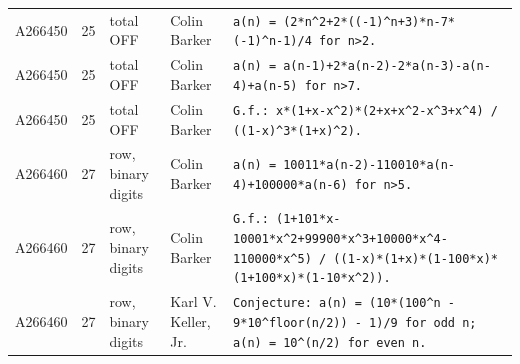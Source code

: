 \documentclass[11pt]{article}
\theoremstyle{definition}
\theoremstyle{remark}
\begin{document}
{\begin{longtable}{p{1.3cm}p{0.7cm}p{2.4cm}p{2.3cm}p{7.3cm}}
A266450 & 25 & total OFF & Colin Barker & \texttt{a(n)\allowbreak{} \allowbreak{}=\allowbreak{} \allowbreak{}(2*\allowbreak{}n\^{}2+\allowbreak{}2*\allowbreak{}((-\allowbreak{}1)\allowbreak{}\^{}n+\allowbreak{}3)\allowbreak{}*\allowbreak{}n-\allowbreak{}7*\allowbreak{}(-\allowbreak{}1)\allowbreak{}\^{}n-\allowbreak{}1)\allowbreak{}/\allowbreak{}4 \allowbreak{}for \allowbreak{}n>2.} \\
A266450 & 25 & total OFF & Colin Barker & \texttt{a(n)\allowbreak{} \allowbreak{}=\allowbreak{} \allowbreak{}a(n-\allowbreak{}1)\allowbreak{}+\allowbreak{}2*\allowbreak{}a(n-\allowbreak{}2)\allowbreak{}-\allowbreak{}2*\allowbreak{}a(n-\allowbreak{}3)\allowbreak{}-\allowbreak{}a(n-\allowbreak{}4)\allowbreak{}+\allowbreak{}a(n-\allowbreak{}5)\allowbreak{} \allowbreak{}for \allowbreak{}n>7.} \\
A266450 & 25 & total OFF & Colin Barker & \texttt{G.f.: \allowbreak{}x*\allowbreak{}(1+\allowbreak{}x-\allowbreak{}x\^{}2)\allowbreak{}*\allowbreak{}(2+\allowbreak{}x+\allowbreak{}x\^{}2-\allowbreak{}x\^{}3+\allowbreak{}x\^{}4)\allowbreak{} \allowbreak{}/\allowbreak{} \allowbreak{}((1-\allowbreak{}x)\allowbreak{}\^{}3*\allowbreak{}(1+\allowbreak{}x)\allowbreak{}\^{}2)\allowbreak{}.} \\
A266460 & 27 & row, binary digits & Colin Barker & \texttt{a(n)\allowbreak{} \allowbreak{}=\allowbreak{} \allowbreak{}10011*\allowbreak{}a(n-\allowbreak{}2)\allowbreak{}-\allowbreak{}110010*\allowbreak{}a(n-\allowbreak{}4)\allowbreak{}+\allowbreak{}100000*\allowbreak{}a(n-\allowbreak{}6)\allowbreak{} \allowbreak{}for \allowbreak{}n>5.} \\
A266460 & 27 & row, binary digits & Colin Barker & \texttt{G.f.: \allowbreak{}(1+\allowbreak{}101*\allowbreak{}x-\allowbreak{}10001*\allowbreak{}x\^{}2+\allowbreak{}99900*\allowbreak{}x\^{}3+\allowbreak{}10000*\allowbreak{}x\^{}4-\allowbreak{}110000*\allowbreak{}x\^{}5)\allowbreak{} \allowbreak{}/\allowbreak{} \allowbreak{}((1-\allowbreak{}x)\allowbreak{}*\allowbreak{}(1+\allowbreak{}x)\allowbreak{}*\allowbreak{}(1-\allowbreak{}100*\allowbreak{}x)\allowbreak{}*\allowbreak{}(1+\allowbreak{}100*\allowbreak{}x)\allowbreak{}*\allowbreak{}(1-\allowbreak{}10*\allowbreak{}x\^{}2)\allowbreak{})\allowbreak{}.} \\
A266460 & 27 & row, binary digits & Karl V. Keller, Jr. & \texttt{Conjecture: \allowbreak{}a(n)\allowbreak{} \allowbreak{}=\allowbreak{} \allowbreak{}(10*\allowbreak{}(100\^{}n \allowbreak{}-\allowbreak{} \allowbreak{}9*\allowbreak{}10\^{}floor(n/\allowbreak{}2)\allowbreak{})\allowbreak{} \allowbreak{}-\allowbreak{} \allowbreak{}1)\allowbreak{}/\allowbreak{}9 \allowbreak{}for \allowbreak{}odd \allowbreak{}n; \allowbreak{}a(n)\allowbreak{} \allowbreak{}=\allowbreak{} \allowbreak{}10\^{}(n/\allowbreak{}2)\allowbreak{} \allowbreak{}for \allowbreak{}even \allowbreak{}n.} \\

\end{longtable}}
\end{document}
